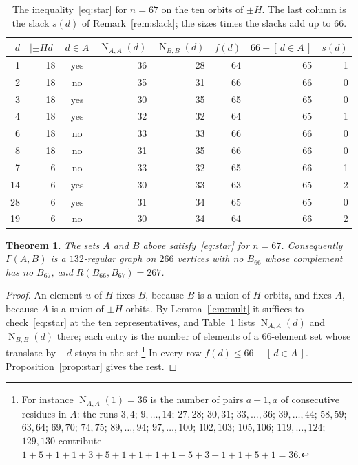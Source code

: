 \documentclass[11pt]{amsart}
\newtheorem{theorem}{Theorem}[section]
\theoremstyle{definition}
\theoremstyle{remark}
\numberwithin{equation}{section}
\newcommand{\NN}{\operatorname{N}}
\newcommand{\ind}[1]{[\,#1\,]}
\begin{document}
\begin{table}[t]
\centering
\caption{The inequality~\eqref{eq:star} for $n=67$ on the ten orbits of $\pm H$. The last column is the slack $s(d)$ of Remark~\ref{rem:slack}; the sizes times the slacks add up to $66$.}
\label{tab:main}
\begin{tabular}{r r c r r r r r}
\toprule
$d$ & $|\pm H d|$ & $d\in A$ & $\NN_{A,A}(d)$ & $\NN_{B,B}(d)$ & $f(d)$ & $66-\ind{d\in A}$ & $s(d)$\\
\midrule
 1 & 18 & yes & 36 & 28 & 64 & 65 & 1\\
 2 & 18 & no  & 35 & 31 & 66 & 66 & 0\\
 3 & 18 & yes & 30 & 35 & 65 & 65 & 0\\
 4 & 18 & yes & 32 & 32 & 64 & 65 & 1\\
 6 & 18 & no  & 33 & 33 & 66 & 66 & 0\\
 8 & 18 & no  & 31 & 35 & 66 & 66 & 0\\
 7 &  6 & no  & 33 & 32 & 65 & 66 & 1\\
14 &  6 & yes & 30 & 33 & 63 & 65 & 2\\
28 &  6 & yes & 31 & 34 & 65 & 65 & 0\\
19 &  6 & no  & 30 & 34 & 64 & 66 & 2\\
\bottomrule
\end{tabular}
\end{table}

\begin{theorem}\label{thm:main}
The sets $A$ and $B$ above satisfy~\eqref{eq:star} for $n=67$. Consequently $\Gamma(A,B)$ is a $132$-regular graph on $266$ vertices with no $B_{66}$ whose complement has no $B_{67}$, and $R(B_{66},B_{67})=267$.
\end{theorem}

\begin{proof}
An element $u$ of $H$ fixes $B$, because $B$ is a union of $H$-orbits, and fixes $A$, because $A$ is a union of $\pm H$-orbits. By Lemma~\ref{lem:mult} it suffices to check~\eqref{eq:star} at the ten representatives, and Table~\ref{tab:main} lists $\NN_{A,A}(d)$ and $\NN_{B,B}(d)$ there; each entry is the number of elements of a $66$-element set whose translate by $-d$ stays in the set.\footnote{For instance $\NN_{A,A}(1)=36$ is the number of pairs $a-1,a$ of consecutive residues in $A$: the runs $3,4$; $9,\dots,14$; $27,28$; $30,31$; $33,\dots,36$; $39,\dots,44$; $58,59$; $63,64$; $69,70$; $74,75$; $89,\dots,94$; $97,\dots,100$; $102,103$; $105,106$; $119,\dots,124$; $129,130$ contribute $1+5+1+1+3+5+1+1+1+1+5+3+1+1+5+1=36$.} In every row $f(d)\le66-\ind{d\in A}$. Proposition~\ref{prop:star} gives the rest.
\end{proof}
\end{document}
